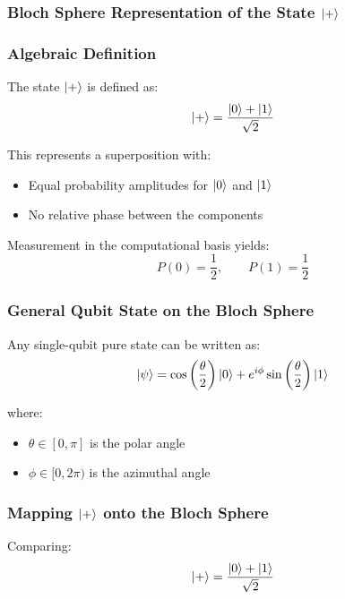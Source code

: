 \subsubsection*{Bloch Sphere Representation of the State $\ket{+}$}

\subsubsection*{Algebraic Definition}

The state $\ket{+}$ is defined as:
\begin{equation}
\ket{+} = \frac{\ket{0} + \ket{1}}{\sqrt{2}}
\end{equation}

This represents a superposition with:
\begin{itemize}
\item Equal probability amplitudes for $\ket{0}$ and $\ket{1}$
\item No relative phase between the components
\end{itemize}

Measurement in the computational basis yields:
\begin{equation}
P(0) = \frac{1}{2}, \qquad P(1) = \frac{1}{2}
\end{equation}

\subsubsection*{General Qubit State on the Bloch Sphere}

Any single-qubit pure state can be written as:
\begin{equation}
\ket{\psi} =
\cos\left(\frac{\theta}{2}\right)\ket{0}
+
e^{i\phi}
\sin\left(\frac{\theta}{2}\right)\ket{1}
\end{equation}

where:
\begin{itemize}
\item $\theta \in [0,\pi]$ is the polar angle
\item $\phi \in [0,2\pi)$ is the azimuthal angle
\end{itemize}

\subsubsection*{Mapping $\ket{+}$ onto the Bloch Sphere}

Comparing:
\begin{equation}
\ket{+} = \frac{\ket{0} + \ket{1}}{\sqrt{2}}
\end{equation}

